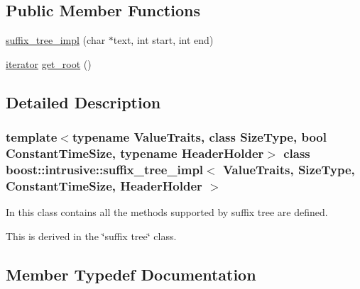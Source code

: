 \subsection*{Public Member Functions}
\begin{DoxyCompactItemize}
\item 
\hyperlink{classboost_1_1intrusive_1_1suffix__tree__impl_aa4b4ae2215af3b696dae241d1cbfe825}{suffix\+\_\+tree\+\_\+impl} (char $\ast$text, int start, int end)
\item 
\hyperlink{classboost_1_1intrusive_1_1suffix__tree__impl_a2df3b52dced59346b59db470e93ba87c}{iterator} \hyperlink{classboost_1_1intrusive_1_1suffix__tree__impl_a76664f3f9926b5d5deb22b08ac964720}{get\+\_\+root} ()
\end{DoxyCompactItemize}


\subsection{Detailed Description}
\subsubsection*{template$<$typename Value\+Traits, class Size\+Type, bool Constant\+Time\+Size, typename Header\+Holder$>$\newline
class boost\+::intrusive\+::suffix\+\_\+tree\+\_\+impl$<$ Value\+Traits, Size\+Type, Constant\+Time\+Size, Header\+Holder $>$}


\begin{DoxyItemize}
\item In this class contains all the methods supported by suffix tree are defined.  
\item This is derived in the \char`\"{}suffix tree\char`\"{} class.  
\end{DoxyItemize}

\subsection{Member Typedef Documentation}
\mbox{\label{classboost_1_1intrusive_1_1suffix__tree__impl_a3e079dda4e4422ad9c911470f3e8c7e2}} 
